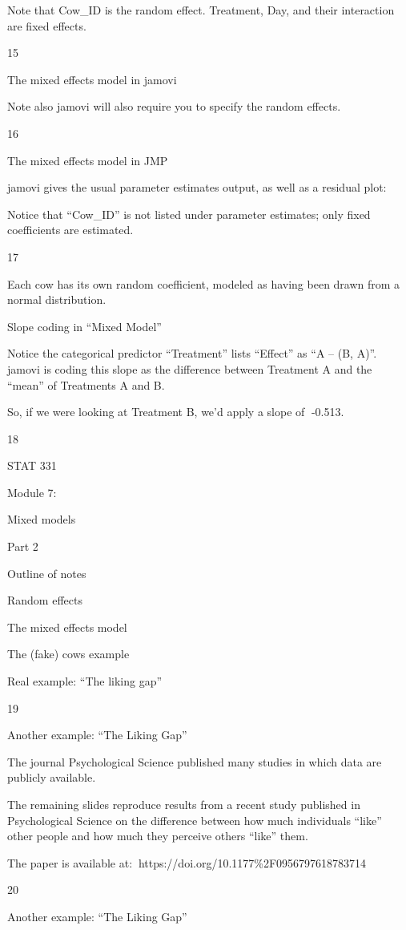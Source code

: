 \documentclass[
  letterpaper,
  DIV=11,
  numbers=noendperiod]{scrreprt}
\begin{document}
Note that Cow\_ID is the random effect. Treatment, Day, and their
interaction are fixed effects.

15

The mixed effects model in jamovi

Note also jamovi will also require you to specify the random effects.

16

The mixed effects model in JMP

jamovi gives the usual parameter estimates output, as well as a residual
plot:

Notice that ``Cow\_ID'' is not listed under parameter estimates; only
fixed coefficients are estimated.

17

Each cow has its own random coefficient, modeled as having been drawn
from a normal distribution.

Slope coding in ``Mixed Model''

Notice the categorical predictor ``Treatment'' lists ``Effect'' as ``A
-- (B, A)''. jamovi is coding this slope as the difference between
Treatment A and the ``mean'' of Treatments A and B.

So, if we were looking at Treatment B, we'd apply a slope of -0.513.

18

STAT 331

Module 7:

Mixed models

Part 2

Outline of notes

Random effects

The mixed effects model

The (fake) cows example

Real example: ``The liking gap''

19

Another example: ``The Liking Gap''

The journal Psychological Science published many studies in which data
are publicly available.

The remaining slides reproduce results from a recent study published in
Psychological Science on the difference between how much individuals
``like'' other people and how much they perceive others ``like'' them.

The paper is available at:https://doi.org/10.1177\%2F0956797618783714

20

Another example: ``The Liking Gap''
\end{document}

